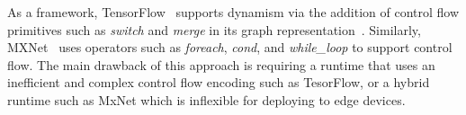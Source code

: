 


    As a framework, TensorFlow~\citep{tensorflow} supports dynamism via the addition
    of control flow primitives such as \emph{switch} and \emph{merge} in its graph
    representation~\citep{yu2018dynamic}. Similarly, MXNet~\citep{mxnet, mxnet-control}
    uses operators such as {\em foreach}, {\em cond}, and {\em while\_loop} to support control flow.
     The main drawback of this approach is requiring a runtime that uses an inefficient and complex
     control flow encoding such as TesorFlow, or a hybrid runtime such as MxNet which is inflexible
     for deploying to edge devices.

